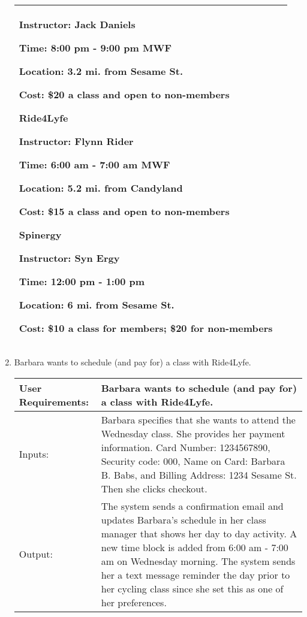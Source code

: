 \documentclass[12pt]{article}
\begin{document}
\begin{enumerate}
\begin{tabular}{| m{4cm} | m{11cm} |}
Instructor: Jack Daniels

Time: 8:00 pm - 9:00 pm MWF

Location: 3.2 mi. from Sesame St.

Cost: \$20 a class and open to non-members
\newline

Ride4Lyfe

Instructor: Flynn Rider

Time: 6:00 am - 7:00 am MWF

Location: 5.2 mi. from Candyland

Cost: \$15 a class and open to non-members
\newline

Spinergy

Instructor: Syn Ergy

Time: 12:00 pm - 1:00 pm

Location: 6 mi. from Sesame St. 

Cost: \$10 a class for members; \$20 for non-members
\\
\hline
\end{tabular}

\item Barbara wants to schedule (and pay for) a class with Ride4Lyfe.

\begin{tabular}{| m{4cm} | m{11cm} |}
\hline
User Requirements: & Barbara wants to schedule (and pay for) a class with Ride4Lyfe. \\
\hline
Inputs: & Barbara specifies that she wants to attend the Wednesday class.
She provides her payment information. 
Card Number: 1234567890, Security code: 000, Name on Card: Barbara B. Babs, and Billing Address: 1234 Sesame St.
Then she clicks checkout.
\\
\hline
Output: & The system sends a confirmation email and updates Barbara’s schedule in her class manager that shows her day to day activity. A new time block is added from 6:00 am - 7:00 am on Wednesday morning.  The system sends her a text message reminder the day prior to her cycling class since she set this as one of her preferences. \\
\hline
\end{tabular}
\end{enumerate}

\newpage
\end{document}
